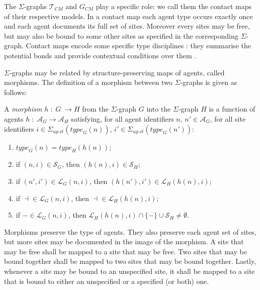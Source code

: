 \documentclass{entcs}
\newcommand{\freesymbol}{\dashv}
\newcommand{\boundsymbol}{-}
\renewcommand{\bound}[1]{\boundsymbol}
\newcommand{\graphsymb}{G}
\newcommand{\linksite}{\signaturesymb_{\textit{ag-st}}}
\newcommand{\signaturesymb}{\Sigma}
\newcommand{\agents}[1][\graphsymb]{\mathcal{A}_{#1}}
\newcommand{\type}[1][\graphsymb]{\textit{type}_{#1}}
\newcommand{\sites}[1][\graphsymb]{\mathcal{S}_{#1}}
\newcommand{\links}[1][\graphsymb]{\mathcal{L}_{#1}}
\begin{document}
The $\Sigma$-graphs $\mathcal{T}_{\textit{CM}}$ and $\graphsymb_{\textit{CM}}$ play a specific role: we call them the contact maps of their respective models. In a contact map each agent type occurs exactly once and each agent documents its full set of sites.  Moreover every sites may be free, but may also be bound to some other sites as specified in the corresponding $\Sigma$-graph. Contact maps encode some  specific type disciplines \cite{DBLP:journals/mscs/DanosHW13}: they summarise the potential bonds and provide contextual conditions over them \cite{Camporesi:CMSB2013}.


$\Sigma$-graphs may be related by structure-preserving maps of agents, called morphisms. The definition of a morphism between two $\Sigma$-graphs  is given as follows:
\begin{defn}[morphisms]
 A \emph{morphism} $h\;:\;G\;\rightarrow H$ from the $\Sigma$-graph $G$ into the $\Sigma$-graph $H$ is a function of agents $h\;:\;\agents[G]\rightarrow \agents[H]$ satisfying,
for all agent identifiers $n$, $n'\in\agents[G]$, for all site identifiers $i\in\linksite(\type[G](n))$, $i'\in\linksite(\type[G](n'))$:
\begin{enumerate}
\item $\type[G](n) = \type[H](h(n))$;
\item if $(n,i)\in\sites[G]$, then $(h(n), i)\in\sites[H]$;
\item if $(n',i')\in\links[G](n,i)$, then $(h(n'),i')\in\links[H](h(n),i)$;
\item if \;$\freesymbol{ }\in\links[G](n,i)$, then \;$\freesymbol{ }\in\links[H](h(n),i)$;
\item if $\bound{}\in\links[G](n,i)$, then  $\links[H](h(n),i)\cap\{\bound{}\}\cup\sites[H]\neq\emptyset$.
\end{enumerate}
\end{defn}

Morphisms preserve the type of agents.
They also preserve each agent set of sites, but more sites may be documented in the image of the morphism. A site that may be free shall be mapped to a site that may be free. Two sites that may be bound together shall be mapped to two sites that may be bound together. Lastly, whenever a site may be bound to an unspecified site, it shall be mapped to a site that is bound to either an unspecified or a specified (or both) one.
\end{document}
